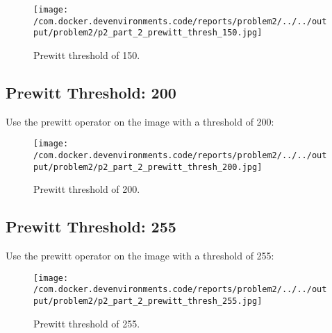 \documentclass{article}%
\begin{document}
\begin{figure}[h!]%
\centering%
\texttt{[image: /com.docker.devenvironments.code/reports/problem2/../../output/problem2/p2\_part\_2\_prewitt\_thresh\_150.jpg]}%
\caption{Prewitt threshold of 150.}%
\end{figure}

%
\subsection{Prewitt Threshold: 200}%
\label{subsec:PrewittThreshold200}%
Use the prewitt operator on the image with a threshold of 200:%


\begin{figure}[h!]%
\centering%
\texttt{[image: /com.docker.devenvironments.code/reports/problem2/../../output/problem2/p2\_part\_2\_prewitt\_thresh\_200.jpg]}%
\caption{Prewitt threshold of 200.}%
\end{figure}

%
\subsection{Prewitt Threshold: 255}%
\label{subsec:PrewittThreshold255}%
Use the prewitt operator on the image with a threshold of 255:%


\begin{figure}[h!]%
\centering%
\texttt{[image: /com.docker.devenvironments.code/reports/problem2/../../output/problem2/p2\_part\_2\_prewitt\_thresh\_255.jpg]}%
\caption{Prewitt threshold of 255.}%
\end{figure}

%
\newpage

%
\end{document}
